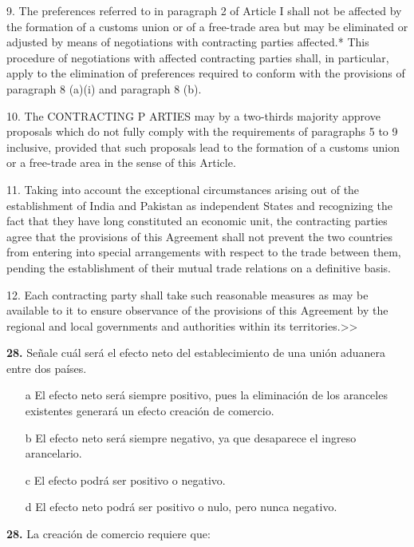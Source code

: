 \documentclass{nuevotema}
\begin{document}
9. The preferences referred to in paragraph 2 of Article I shall not be
affected by the formation of a customs union or of a free-trade area but
may be eliminated or adjusted by means of negotiations with contracting
parties affected.* This procedure of negotiations with affected contracting
parties shall, in particular, apply to the elimination of preferences required
to conform with the provisions of paragraph 8 (a)(i) and paragraph 8 (b).

10. The CONTRACTING P ARTIES may by a two-thirds majority
approve proposals which do not fully comply with the requirements of
paragraphs 5 to 9 inclusive, provided that such proposals lead to the
formation of a customs union or a free-trade area in the sense of this
Article.

11. Taking into account the exceptional circumstances arising out of
the establishment of India and Pakistan as independent States and
recognizing the fact that they have long constituted an economic unit, the
contracting parties agree that the provisions of this Agreement shall not
prevent the two countries from entering into special arrangements with
respect to the trade between them, pending the establishment of their
mutual trade relations on a definitive basis.

12. Each contracting party shall take such reasonable measures as
may be available to it to ensure observance of the provisions of this
Agreement by the regional and local governments and authorities within
its territories.>>

\preguntas


\textbf{28.} Señale cuál será el efecto neto del establecimiento de una unión aduanera entre dos países.

\begin{itemize}
	\item[a] El efecto neto será siempre positivo, pues la eliminación de los aranceles existentes generará un efecto creación de comercio.
	\item[b] El efecto neto será siempre negativo, ya que desaparece el ingreso arancelario.
	\item[c] El efecto podrá ser positivo o negativo.
	\item[d] El efecto neto podrá ser positivo o nulo, pero nunca negativo.
\end{itemize}

\textbf{28.} La creación de comercio requiere que:
\end{document}
